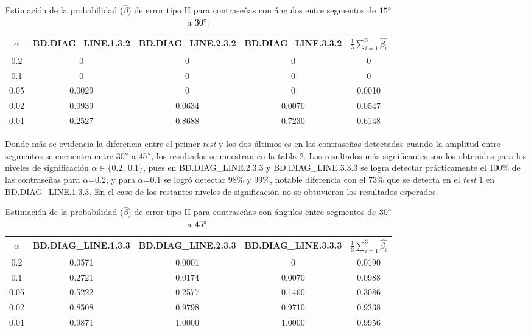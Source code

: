 \documentclass[12pt]{report}
\begin{document}
\begin{table}[h!]
	\centering
		\caption{Estimación de la probabilidad ($\hat{\beta}$) de error tipo II para contraseñas con ángulos entre segmentos de $15\degree$ a $30\degree$.}
	\begin{tabular}{|c|ccc|c|}
		\hline
		$\alpha$& BD.DIAG\_LINE.1.3.2 & BD.DIAG\_LINE.2.3.2 & BD.DIAG\_LINE.3.3.2 &$\frac{1}{3} \sum_{i=1}^{3} \hat{\beta_i}$ \\
		\hline
		0.2 & 0     	    & 0     		& 0     & 0    \\
		0.1 & 0			    & 0   	   	    & 0     &  0   \\
		0.05& 0.0029     	& 0     	 & 0     & 0.0010 \\
		0.02& 0.0939     	& 0.0634   	 & 0.0070 & 0.0547    \\
		0.01& 0.2527     	& 0.8688   & 0.7230 & 0.6148     \\
		\hline
	\end{tabular}

	\label{tab:error2-15-30}
\end{table}


Donde más se evidencia la diferencia entre  el primer \textit{test} y los dos últimos es en las contraseñas detectadas cuando la amplitud entre segmentos se encuentra entre 30$\degree$ a 45$\degree$, los resultados se muestran en la tabla \ref{tab:error2-30-45}. Los resultados más significantes son los obtenidos para los niveles de significación $\alpha \in \{$0.2, 0.1$\}$, pues en   BD.DIAG\_LINE.2.3.3 y BD.DIAG\_LINE.3.3.3  se logra detectar prácticamente el 100\% de las contraseñas para $\alpha$=0.2, y para $\alpha$=0.1 se logró detectar 98\% y 99\%, notable diferencia con el 73\% que se detecta en el \textit{test} 1 en BD.DIAG\_LINE.1.3.3. En el caso de los restantes niveles de significación no se obtuvieron los resultados esperados.
\begin{table}[h!]
	\centering
	\caption{Estimación de la probabilidad ($\hat{\beta}$) de error tipo II para contraseñas con ángulos entre segmentos de $30\degree$ a $45\degree$.}
	\begin{tabular}{|c|ccc|c|}
		\hline
		$\alpha$& BD.DIAG\_LINE.1.3.3 & BD.DIAG\_LINE.2.3.3 & BD.DIAG\_LINE.3.3.3 &$\frac{1}{3} \sum_{i=1}^{3} \hat{\beta_i}$ \\
		\hline
		0.2 & 0.0571     & 0.0001     & 0        &   0.0190   \\
		0.1 & 0.2721      & 0.0174    & 0.0070    &  0.0988  \\
		0.05& 0.5222    & 0.2577     & 0.1460     &  0.3086  \\
		0.02& 0.8508     & 0.9798    & 0.9710     &   0.9338  \\
		0.01& 0.9871     & 1.0000     & 1.0000   &   0.9956  \\
		\hline
	\end{tabular}

	\label{tab:error2-30-45}
\end{table}
\end{document}
